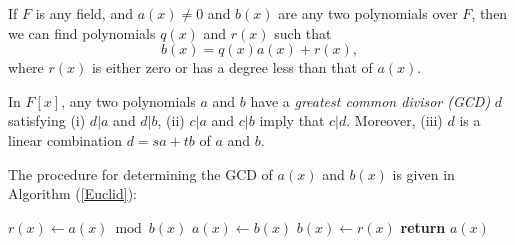\begin{theorem}
If $F$ is any field, and $a(x) \ne 0$ and $b(x)$ are any two polynomials over $F$, then we can find polynomials $q(x)$ and $r(x)$ such that
\[ b(x) = q(x)a(x) + r(x),\] where $r(x)$ is either zero or has a degree less than that of $a(x)$. 
\end{theorem}

\begin{theorem}
In $F[x]$, any two polynomials $a$ and $b$ have a {\it greatest common divisor (GCD)} $d$ satisfying (i) $d | a$ and $d | b$, (ii) $c | a$ and $c | b$ imply that $c | d$. Moreover, (iii) $d$ is a linear combination $d = sa + tb$ of $a$ and $b$. 
\end{theorem}

The procedure for determining the GCD of $a(x)$ and $b(x)$ is given in  Algorithm (\ref{Euclid}): 

\begin{algorithm}
\caption{Polynomial Euclidean Algorithm}
\begin{algorithmic}[1]
\State $r(x) \gets a(x) \bmod b(x)$
\State $a(x) \gets b(x)$
\State $b(x) \gets r(x)$
\EndWhile
\State \textbf{return} $a(x)$
\EndProcedure
\end{algorithmic}\label{Euclid}
\end{algorithm}


